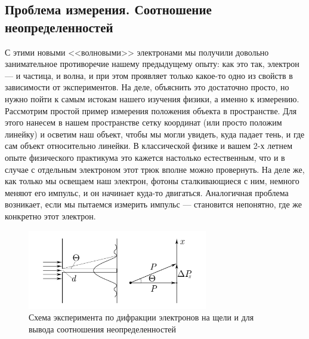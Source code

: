 \documentclass[12pt]{article}
\begin{document}
\subsection{Проблема измерения. Соотношение неопределенностей}
С этими новыми <<волновыми>> электронами мы получили довольно занимательное противоречие нашему предыдущему опыту: как это так, электрон --- и частица, и волна, и при этом проявляет только какое-то одно из свойств в зависимости от экспериментов. На деле, объяснить это достаточно просто, но нужно пойти к самым истокам нашего изучения физики, а именно к измерению. Рассмотрим простой пример измерения положения объекта в пространстве. Для этого нанесем в нашем пространстве сетку координат (или просто положим линейку) и осветим наш объект, чтобы мы могли увидеть, куда падает тень, и где сам объект относительно линейки. В классической физике и вашем 2-х летнем опыте физического практикума это кажется настолько естественным, что и в случае с отдельным электроном этот трюк вполне можно провернуть. На деле же, как только мы освещаем наш электрон, фотоны сталкивающиеся с ним, немного меняют его импульс, и он начинает куда-то двигаться. Аналогичная проблема возникает, если мы пытаемся измерить импульс --- становится непонятно, где же конкретно этот электрон.
\begin{figure}[h]
    \centering
    \includegraphics[width=0.7\textwidth,keepaspectratio]{Seminar_03/pics/pic_02.png}
    \caption{Схема эксперимента по дифракции электронов на щели и для вывода соотношения неопределенностей}
    \label{fig:sem_03_electron_diffraction}
\end{figure}
\end{document}
